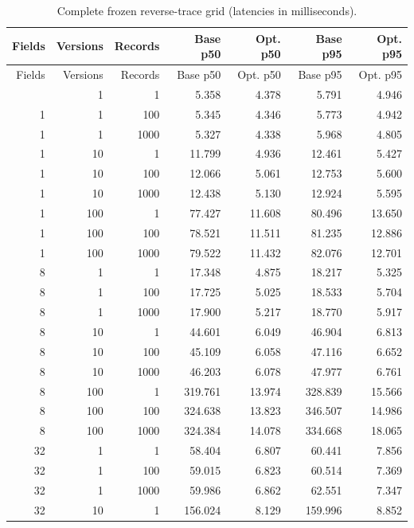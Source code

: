 \begingroup\small
\begin{longtable}{@{}rrrrrrr@{}}
\caption{Complete frozen reverse-trace grid (latencies in milliseconds).}\label{tab:trace-complete-grid}\\
\toprule Fields & Versions & Records & Base p50 & Opt. p50 & Base p95 & Opt. p95 \\
\midrule\endfirsthead
\toprule Fields & Versions & Records & Base p50 & Opt. p50 & Base p95 & Opt. p95 \\
\midrule\endhead
\bottomrule\endfoot
1 & 1 & 1 & 5.358 & 4.378 & 5.791 & 4.946 \\
1 & 1 & 100 & 5.345 & 4.346 & 5.773 & 4.942 \\
1 & 1 & 1000 & 5.327 & 4.338 & 5.968 & 4.805 \\
1 & 10 & 1 & 11.799 & 4.936 & 12.461 & 5.427 \\
1 & 10 & 100 & 12.066 & 5.061 & 12.753 & 5.600 \\
1 & 10 & 1000 & 12.438 & 5.130 & 12.924 & 5.595 \\
1 & 100 & 1 & 77.427 & 11.608 & 80.496 & 13.650 \\
1 & 100 & 100 & 78.521 & 11.511 & 81.235 & 12.886 \\
1 & 100 & 1000 & 79.522 & 11.432 & 82.076 & 12.701 \\
8 & 1 & 1 & 17.348 & 4.875 & 18.217 & 5.325 \\
8 & 1 & 100 & 17.725 & 5.025 & 18.533 & 5.704 \\
8 & 1 & 1000 & 17.900 & 5.217 & 18.770 & 5.917 \\
8 & 10 & 1 & 44.601 & 6.049 & 46.904 & 6.813 \\
8 & 10 & 100 & 45.109 & 6.058 & 47.116 & 6.652 \\
8 & 10 & 1000 & 46.203 & 6.078 & 47.977 & 6.761 \\
8 & 100 & 1 & 319.761 & 13.974 & 328.839 & 15.566 \\
8 & 100 & 100 & 324.638 & 13.823 & 346.507 & 14.986 \\
8 & 100 & 1000 & 324.384 & 14.078 & 334.668 & 18.065 \\
32 & 1 & 1 & 58.404 & 6.807 & 60.441 & 7.856 \\
32 & 1 & 100 & 59.015 & 6.823 & 60.514 & 7.369 \\
32 & 1 & 1000 & 59.986 & 6.862 & 62.551 & 7.347 \\
32 & 10 & 1 & 156.024 & 8.129 & 159.996 & 8.852 \\

\end{longtable}
